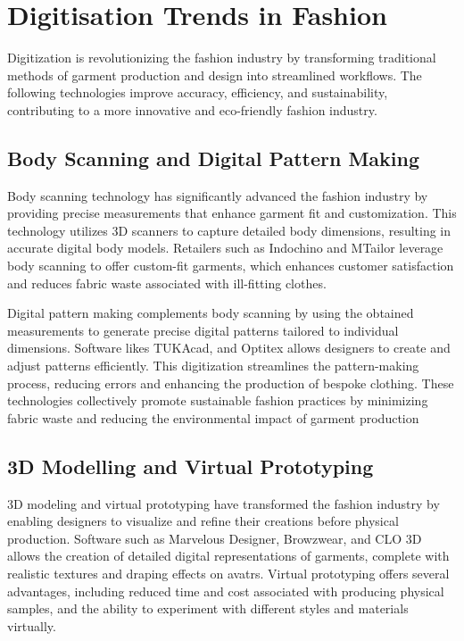 \section{Digitisation Trends in Fashion}
Digitization is revolutionizing the fashion industry by transforming traditional methods of garment production and design into streamlined workflows. The following technologies improve accuracy, efficiency, and sustainability, contributing to a more innovative and eco-friendly fashion industry.

\subsection{Body Scanning and Digital Pattern Making}
Body scanning technology has significantly advanced the fashion industry by providing precise measurements that enhance garment fit and customization. This technology utilizes 3D scanners to capture detailed body dimensions, resulting in accurate digital body models. Retailers such as Indochino and MTailor leverage body scanning to offer custom-fit garments, which enhances customer satisfaction and reduces fabric waste associated with ill-fitting clothes.

Digital pattern making complements body scanning by using the obtained measurements to generate precise digital patterns tailored to individual dimensions. Software likes TUKAcad, and Optitex allows designers to create and adjust patterns efficiently. This digitization streamlines the pattern-making process, reducing errors and enhancing the production of bespoke clothing. These technologies collectively promote sustainable fashion practices by minimizing fabric waste and reducing the environmental impact of garment production 

\subsection{3D Modelling and Virtual Prototyping}
3D modeling and virtual prototyping have transformed the fashion industry by enabling designers to visualize and refine their creations before physical production. Software such as Marvelous Designer, Browzwear, and CLO 3D allows the creation of detailed digital representations of garments, complete with realistic textures and draping effects on avatrs. Virtual prototyping offers several advantages, including reduced time and cost associated with producing physical samples, and the ability to experiment with different styles and materials virtually.

